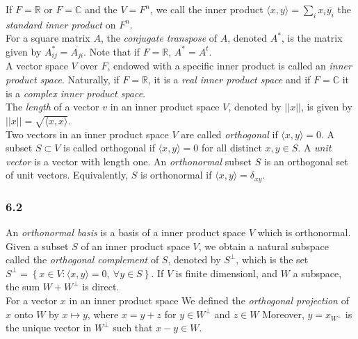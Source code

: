 \documentclass{article}
\begin{document}
If $F = \mathbb{R}$ or $F= \mathbb{C}$ and the $V =  F^n$, we call the inner product $\langle x, y \rangle = \sum_i x_i\overline{y_i}$ the \textit{standard inner product} on $F^n$. \\

For a square matrix $A$, the \textit{conjugate transpose} of $A$, denoted $A^*$, is the matrix given by $A^*_{ij} = \overline{A_{ji}}$. Note that if $F = \mathbb{R}$, $A^* = A^t$. \\

A vector space $V$ over $F$, endowed with a specific inner product is called an \textit{inner product space}. Naturally, if $F = \mathbb{R}$, it is a \textit{real inner product space} and if $F= \mathbb{C}$ it is a \textit{complex inner product space}. \\

The \textit{length} of a vector $v$ in an inner product space $V$, denoted by $||x||$, is given by $||x|| = \sqrt{\langle x, x \rangle }$. \\

Two vectors in an inner product space $V$ are called \textit{orthogonal} if $\langle x, y \rangle = 0$. A subset $S \subset V$ is called orthogonal if $\langle x, y \rangle = 0$ for all distinct $x, y \in S$. A \textit{unit vector} is a vector with length one. An \textit{orthonormal} subset $S$ is an orthogonal set of unit vectors. Equivalently, $S$ is orthonormal if $\langle x, y \rangle = \delta_{xy}$. \\

\subsubsection*{6.2}

An \textit{orthonormal basis} is a basis of a inner product space $V$ which is orthonormal. \\

Given a subset $S$ of an inner product space $V$, we obtain a natural subspace called the \textit{orthogonal complement} of $S$, denoted by $S^\perp$, which is the set $S^\perp = \left\{x \in V: \langle x, y \rangle = 0, \ \forall y \in S \right\}$. If $V$ is finite dimensionl, and $W$ a subspace, the sum $W + W^\perp$ is direct. \\

For a vector $x$ in an inner product space We defined the \textit{orthogonal projection} of $x$ onto $W$ by $x \mapsto y $, where $x = y + z$ for $y \in W^\perp$ and $z \in W$ 
Moreover, $y = x_{W^\perp}$ is the unique vector in $W^\perp$ such that $x - y \in W$. \\
\end{document}
